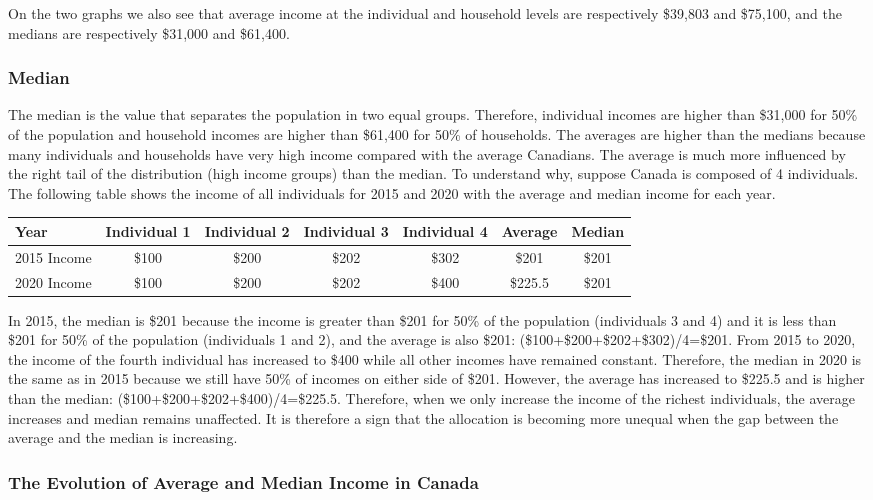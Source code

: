 \documentclass[letterpaper]{article}\usepackage[]{graphicx}\usepackage[]{color}
\numberwithin{exer}{section}
\theoremstyle{nonumberplain}
\begin{document}
On the two graphs we also see that average income at the individual
and household levels are respectively \$39,803 and
\$75,100, and the medians are respectively \$31,000 and
\$61,400. 

\subsubsection*{Median}

The median is the value that separates the population in two equal
groups. Therefore, individual incomes are higher than \$31,000
for 50\% of the population and household incomes are higher than
\$61,400 for 50\% of households. The averages are higher than
the medians because many individuals and households have very high
income compared with the average Canadians. The average is much more
influenced by the right tail of the distribution (high income groups)
than the median. To understand why, suppose Canada is composed of 4
individuals. The following table shows the income of all individuals
for 2015 and 2020 with the average and median income for each year.
\begin{center}
\begin{tabular}{lcccc||cc}
Year &Individual 1&Individual 2&Individual 3 & Individual 4 & Average&
Median\\\hline 2015 Income & \$100 & \$200 & \$202 & \$302 & \$201 &
\$201\\ 2020 Income & \$100 & \$200 & \$202 & \$400 & \$225.5 & \$201
\end{tabular}
\end{center}
In 2015, the median is \$201 because the income is greater than \$201
for 50\% of the population (individuals 3 and 4) and it is less than
\$201 for 50\% of the population (individuals 1 and 2), and the
average is also \$201: (\$100+\$200+\$202+\$302)/4=\$201. From 2015 to
2020, the income of the fourth individual has increased to \$400 while
all other incomes have remained constant. Therefore, the median in
2020 is the same as in 2015 because we still have 50\% of incomes on
either side of \$201. However, the average has increased to \$225.5
and is higher than the median:
(\$100+\$200+\$202+\$400)/4=\$225.5. Therefore, when we only increase
the income of the richest individuals, the average increases and
median remains unaffected. It is therefore a sign that the allocation
is becoming more unequal when the gap between the average and the
median is increasing.

\subsubsection*{The Evolution of Average and Median Income in Canada}
\end{document}
